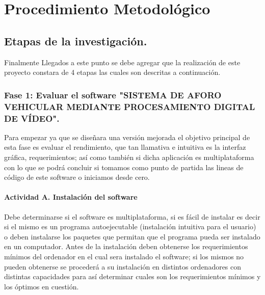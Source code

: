 
\chapter{Procedimiento Metodológico} %

\label{Capitulo3} %


\section{Etapas de la investigación.}
Finalmente Llegados a este punto se debe agregar que la realización de este proyecto constara de 4 etapas las cuales son descritas a continuación. 


\subsection{Fase 1: Evaluar el software "SISTEMA DE AFORO VEHICULAR MEDIANTE PROCESAMIENTO DIGITAL DE VÍDEO".}


Para empezar ya que se diseñara una versión mejorada el objetivo principal de esta fase es evaluar el rendimiento, que tan llamativa e intuitiva es la interfaz gráfica, requerimientos; así como también si dicha aplicación es multiplataforma con lo que se podrá concluir si tomamos como punto de partida las lineas de código de este software o iniciamos desde cero.

\subsubsection{Actividad A.  Instalación del software}

Debe determinarse si el software es multiplataforma, si es fácil de instalar es decir si el mismo es un programa autoejecutable (instalación intuitiva para el usuario) o deben instalarse los paquetes que permitan que el programa pueda ser instalado en un computador. Antes de la instalación deben  obtenerse los requerimientos mínimos del ordenador en el cual sera instalado el software; si los mismos no pueden obtenerse se procederá a su instalación en distintos ordenadores con distintas capacidades para así determinar cuales son los requerimientos mínimos y los óptimos en cuestión.

